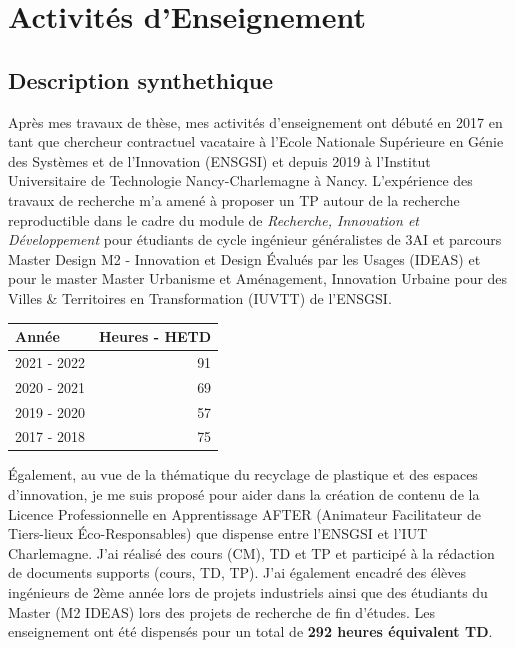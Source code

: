 \documentclass[
  12pt,
  oneside]{book}
\begin{document}
\hypertarget{activituxe9s-denseignement}{%
\chapter{Activités d'Enseignement}\label{activituxe9s-denseignement}}

\hypertarget{description-synthethique}{%
\section{Description synthethique}\label{description-synthethique}}

Après mes travaux de thèse, mes activités d'enseignement ont débuté en 2017 en tant que chercheur contractuel vacataire à l'Ecole Nationale Supérieure en Génie des Systèmes et de l'Innovation (ENSGSI) et depuis 2019 à l'Institut Universitaire de Technologie Nancy-Charlemagne à Nancy.
L'expérience des travaux de recherche m'a amené à proposer un TP autour de la recherche reproductible dans le cadre du module de \emph{Recherche, Innovation et Développement} pour étudiants de cycle ingénieur généralistes de 3AI et parcours Master Design M2 - Innovation et Design Évalués par les Usages (IDEAS) et pour le master Master Urbanisme et Aménagement, Innovation Urbaine pour des Villes \& Territoires en Transformation (IUVTT) de l'ENSGSI.

\begin{table}
\centering
\begin{tabular}[t]{lr}
\toprule
Année & Heures - HETD\\
\midrule
2021 - 2022 & 91\\
2020 - 2021 & 69\\
2019 - 2020 & 57\\
2017 - 2018 & 75\\
\bottomrule
\end{tabular}
\end{table}

Également, au vue de la thématique du recyclage de plastique et des espaces d'innovation, je me suis proposé pour aider dans la création de contenu de la Licence Professionnelle en Apprentissage AFTER (Animateur Facilitateur de Tiers-lieux Éco-Responsables) que dispense entre l'ENSGSI et l'IUT Charlemagne. J'ai réalisé des cours (CM), TD et TP et participé à la rédaction de documents supports (cours, TD, TP). J'ai également encadré des élèves ingénieurs de 2ème année lors de projets industriels ainsi que des étudiants du Master (M2 IDEAS) lors des projets de recherche de fin d'études. Les enseignement ont été dispensés pour un total de \textbf{292 heures équivalent TD}.
\end{document}
